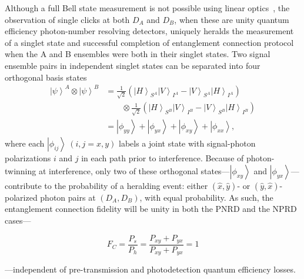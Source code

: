 \documentclass[aps,twocolumn,secnumarabic,amsmath,amssymb,pra,groupedaddress,
showpacs, showkeys]{revtex4-1}
\newcommand{\ket}[1]{\left|#1\right\rangle}
\newcommand{\pna}[1]{\left(#1\right)}
\newcommand{\eqn}[1]{
\begin{equation}
	#1
\end{equation}
}
\begin{document}
Although a full Bell state measurement is not possible using linear
optics~\cite{PhysRevA.59.3295}, the observation of single clicks at both $D_A$
and $D_B$, when these are unity quantum efficiency photon-number resolving
detectors, uniquely heralds the measurement of a singlet state and successful
completion of entanglement connection protocol when the A and B ensembles were
both in their singlet states. Two signal ensemble pairs in independent singlet
states can be separated into four orthogonal basis states
\begin{align}
\ket{\psi}^A \otimes \ket{\psi}^B & =
\frac{1}{\sqrt{2}}\pna{\ket{H}_{S^A}\ket{V}_{I^A}-\ket{V}_{S^A}\ket{H}_{I^A}}\nonumber
\\ 
& \qquad \otimes \frac{1}{\sqrt{2}}\pna{\ket{H}_{S^B}\ket{V}_{I^B}-\ket{V}_{S^B}\ket{H}_{I^B}} \nonumber \\
& = \ket{\phi_{yy}}+\ket{\phi_{yx}}+\ket{\phi_{xy}}+\ket{\phi_{xx}},
\end{align}
where each $\ket{\phi_{ij}}~\pna{i,j=x,y}$ labels a joint state with
signal-photon polarizations $i$ and $j$ in each path prior to interference.
Because of photon-twinning at interference, only two of these orthogonal
states---$\ket{\phi_{xy}}$ and $\ket{\phi_{yx}}$---contribute to the
probability of a heralding event: either $\pna{\hat{x},\hat{y}}$- or
$\pna{\hat{y},\hat{x}}$-polarized photon pairs at $\pna{D_A,D_B}$, with equal
probability.  As such, the entanglement connection fidelity will be unity in
both the PNRD and the NPRD cases---
\eqn{
F_C = \frac{P_{s}}{P_{h}} = \frac{P_{xy}+P_{yx}}{P_{xy}+P_{yx}}=1
}
---independent of pre-transmission and photodetection quantum efficiency losses. 
\end{document}
